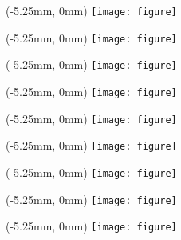 \documentclass{article}
\begin{document}
    \begin{textblock*}{0mm}(-5.25mm, 0mm)
        \texttt{[image: figure]}
    \end{textblock*}

	\begin{textblock*}{0mm}(-5.25mm, 0mm)
        \texttt{[image: figure]}
    \end{textblock*}

	\begin{textblock*}{0mm}(-5.25mm, 0mm)
        \texttt{[image: figure]}
    \end{textblock*}

	\begin{textblock*}{0mm}(-5.25mm, 0mm)
        \texttt{[image: figure]}
    \end{textblock*}

	\begin{textblock*}{0mm}(-5.25mm, 0mm)
        \texttt{[image: figure]}
    \end{textblock*}

	\begin{textblock*}{0mm}(-5.25mm, 0mm)
        \texttt{[image: figure]}
    \end{textblock*}

	\begin{textblock*}{0mm}(-5.25mm, 0mm)
        \texttt{[image: figure]}
    \end{textblock*}

	\begin{textblock*}{0mm}(-5.25mm, 0mm)
        \texttt{[image: figure]}
    \end{textblock*}

	\begin{textblock*}{0mm}(-5.25mm, 0mm)
        \texttt{[image: figure]}
    \end{textblock*}
\end{document}
